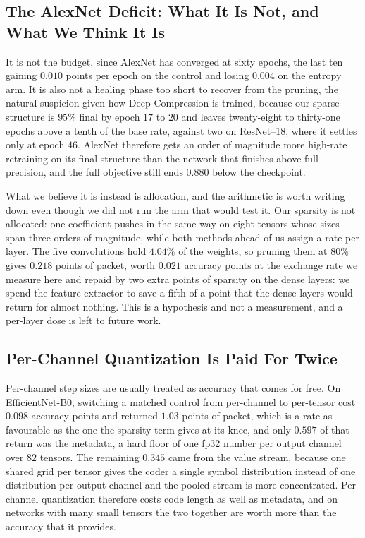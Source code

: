 \documentclass{article}
\begin{document}
\subsection{The AlexNet Deficit: What It Is Not, and What We Think It Is}
\label{app:alexnet-deficit}
 It is not the budget, since AlexNet has
converged at sixty epochs, the last ten gaining $0.010$ points per epoch on the
control and losing $0.004$ on the entropy arm. It is also not a healing phase too
short to recover from the pruning, the natural suspicion given how Deep
Compression is trained, because our sparse structure is $95\%$ final by epoch
$17$ to $20$ and leaves twenty-eight to thirty-one epochs above a tenth of the
base rate, against two on ResNet--18, where it settles only at epoch $46$.
AlexNet therefore gets an order of magnitude more high-rate retraining on its
final structure than the network that finishes above full precision, and the full
objective still ends $0.880$ below the checkpoint.

What we believe it is instead is allocation, and the arithmetic is worth writing
down even though we did not run the arm that would test it. Our sparsity is not
allocated: one coefficient pushes in the same way on eight tensors whose sizes
span three orders of magnitude, while both methods ahead of us assign a rate per
layer. The five convolutions hold $4.04\%$ of the weights, so pruning them at
$80\%$ gives $0.218$ points of packet, worth $0.021$ accuracy points at the
exchange rate we measure here and repaid by two extra points of sparsity on the
dense layers: we spend the feature extractor to save a fifth of a point that the
dense layers would return for almost nothing. This is a hypothesis and not a
measurement, and a per-layer dose is left to future work.


\subsection{Per-Channel Quantization Is Paid For Twice}
\label{sec:per-channel-twice}

Per-channel step sizes are usually treated as accuracy that comes for free. On
EfficientNet-B0, switching a matched control from per-channel to per-tensor cost
$0.098$ accuracy points and returned $1.03$ points of packet, which is a rate as
favourable as the one the sparsity term gives at its knee, and only $0.597$ of
that return was the metadata, a hard floor of one fp32 number per output channel
over $82$ tensors. The remaining $0.345$ came from the value stream, because one
shared grid per tensor gives the coder a single symbol distribution instead of
one distribution per output channel and the pooled stream is more concentrated.
Per-channel quantization therefore costs code length as well as metadata, and on
networks with many small tensors the two together are worth more than the
accuracy that it provides.
\end{document}
